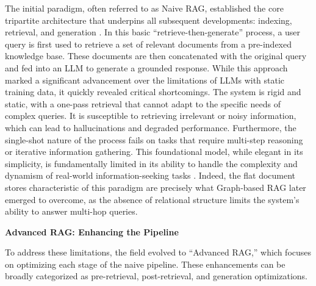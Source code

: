 \documentclass[11pt]{article}
\begin{document}
The initial paradigm, often referred to as Naive RAG, established the core tripartite architecture that underpins all subsequent developments: indexing, retrieval, and generation \cite{ref23}. In this basic ``retrieve-then-generate'' process, a user query is first used to retrieve a set of relevant documents from a pre-indexed knowledge base. These documents are then concatenated with the original query and fed into an LLM to generate a grounded response. While this approach marked a significant advancement over the limitations of LLMs with static training data, it quickly revealed critical shortcomings. The system is rigid and static, with a one-pass retrieval that cannot adapt to the specific needs of complex queries. It is susceptible to retrieving irrelevant or noisy information, which can lead to hallucinations and degraded performance. Furthermore, the single-shot nature of the process fails on tasks that require multi-step reasoning or iterative information gathering. This foundational model, while elegant in its simplicity, is fundamentally limited in its ability to handle the complexity and dynamism of real-world information-seeking tasks \cite{ref24,ref23}. Indeed, the flat document stores characteristic of this paradigm are precisely what Graph-based RAG later emerged to overcome, as the absence of relational structure limits the system's ability to answer multi-hop queries.

\textbf{Advanced RAG: Enhancing the Pipeline}

To address these limitations, the field evolved to ``Advanced RAG,'' which focuses on optimizing each stage of the naive pipeline. These enhancements can be broadly categorized as pre-retrieval, post-retrieval, and generation optimizations.
\end{document}
